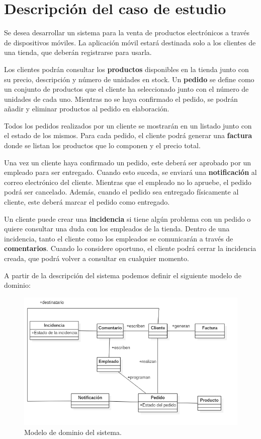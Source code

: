 \documentclass[11pt,spanish,listoffigures]{tfgetsinf}
\begin{document}
\section{Descripción del caso de estudio}

Se desea desarrollar un sistema para la venta de productos electrónicos a través de dispositivos móviles. La aplicación móvil estará destinada solo a los clientes de una tienda, que deberán registrarse para usarla.

Los clientes podrán consultar los \textbf{productos} disponibles en la tienda junto con su precio, descripción y número de unidades en stock. Un \textbf{pedido} se define como un conjunto de productos que el cliente ha seleccionado junto con el número de unidades de cada uno. Mientras no se haya confirmado el pedido, se podrán añadir y eliminar productos al pedido en elaboración.

Todos los pedidos realizados por un cliente se mostrarán en un listado junto con el estado de los mismos. Para cada pedido, el cliente podrá generar una \textbf{factura} donde se listan los productos que lo componen y el precio total.

Una vez un cliente haya confirmado un pedido, este deberá ser aprobado por un empleado para ser entregado. Cuando esto suceda, se enviará una \textbf{notificación} al correo electrónico del cliente. Mientras que el empleado no lo apruebe, el pedido podrá ser cancelado. Además, cuando el pedido sea entregado físicamente al cliente, este deberá marcar el pedido como entregado.

Un cliente puede crear una \textbf{incidencia} si tiene algún problema con un pedido o quiere consultar una duda con los empleados de la tienda. Dentro de una incidencia, tanto el cliente como los empleados se comunicarán a través de \textbf{comentarios}. Cuando lo considere oportuno, el cliente podrá cerrar la incidencia creada, que podrá volver a consultar en cualquier momento.

A partir de la descripción del sistema podemos definir el siguiente modelo de dominio:

\begin{figure}[h]
\centering
\includegraphics[scale=0.5]{modelo_dominio_final}
\caption{Modelo de dominio del sistema.}
\end{figure}
\end{document}
